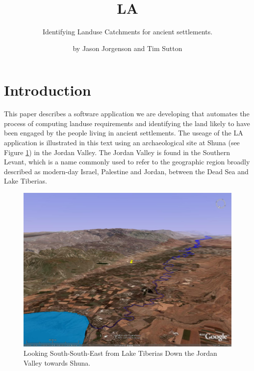 

\title{LA} \subtitle{Identifying Landuse Catchments for 
ancient settlements.}

\author{by Jason Jorgenson and Tim Sutton}

\maketitle

\section{Introduction} \label{sec:Introduction}
  This paper describes a software application we are developing that automates
  the process of computing landuse requirements and identifying the land likely 
  to have been engaged by the people living in ancient settlements.
  The useage of the LA application is illustrated in this text using an
  archaeological site at Shuna (see Figure \ref{fig:shunaGoogleEarth}) in the Jordan
  Valley.  The Jordan Valley is found in the Southern Levant, which is a name
  commonly used to refer to the geographic region broadly described as modern-day
  Israel, Palestine and Jordan, between the Dead Sea and Lake Tiberias.

\begin{figure}[htbp] %
  \includegraphics[scale=0.17]{./images/ShunaGoogleEarth3D.jpg}
  \caption{\label{fig:shunaGoogleEarth}Looking South-South-East from Lake
    Tiberias Down the Jordan Valley towards Shuna.} 
\end{figure}

